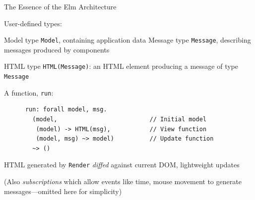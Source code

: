 \documentclass[11.5pt, aspectratio=169]{beamer}
\begin{document}
\begin{frame}[fragile]{The Essence of the Elm Architecture}

  \begin{fullpageitemize}
  \item<1-> User-defined types:
    \begin{itemize}
      \itemR Model type \verb+Model+, containing application data
      \itemR Message type \verb+Message+, describing messages produced by components
    \end{itemize}
    \vspace{0em}

  \item<2-> HTML type \verb+HTML(Message)+: an HTML element producing a message of
    type \verb+Message+

  \item<3-> A function, \verb+run+:
    \begin{verbatim}
      run: forall model, msg.
        (model,                          // Initial model
         (model) -> HTML(msg),           // View function
         (model, msg) ~> model)          // Update function
        ~> ()
    \end{verbatim}

    \vspace{0em}

  \item<4-> HTML generated by \verb+Render+ \emph{diffed} against current DOM, lightweight updates
  \item<5-> (Also \emph{subscriptions} which allow events like time, mouse movement
    to generate messages---omitted here for simplicity)
  \end{fullpageitemize}
\end{frame}
\end{document}
